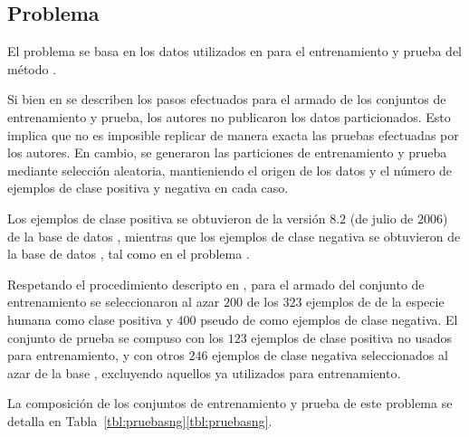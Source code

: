 %
%
\subsection{Problema \mipred{}}
%
El problema \prob\mipred{} se basa en los datos utilizados en
\cite{ng} para el entrenamiento y prueba del método \work\mipred{}.

Si bien en \cite{ng} se describen los pasos efectuados para el armado
de los conjuntos de entrenamiento y prueba, los autores no publicaron
los datos particionados.
Esto implica que no es imposible replicar de manera exacta las pruebas
efectuadas por los autores.
En cambio, se generaron las particiones de entrenamiento y prueba
mediante selección aleatoria, mantieniendo el origen de los datos y el
número de ejemplos de clase positiva y negativa en cada caso.

Los ejemplos de clase positiva se obtuvieron de la versión $8$.$2$ (de
julio de $2006$) de la base de datos \dset{\mirbase}, mientras que los
ejemplos de clase negativa se obtuvieron de la base de datos
, tal como en el problema \prob\tripletsvm{}.

Respetando el procedimiento descripto en \cite{ng}, para el armado del
conjunto de entrenamiento  se seleccionaron al azar $200$
de los $323$ ejemplos de  de la especie humana como clase
positiva y $400$ pseudo  de  como ejemplos de
clase negativa.
El conjunto de prueba  se compuso con los $123$ ejemplos de
clase positiva no usados para entrenamiento, y con otros $246$
ejemplos de clase negativa seleccionados al azar de la base
, excluyendo aquellos ya utilizados para entrenamiento.

La composición de los conjuntos de entrenamiento y prueba de este
problema se detalla en
\iflatexml{}Tabla~\ref{tbl:pruebasng}\else\autoref{tbl:pruebasng}\fi.
